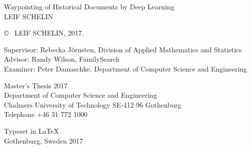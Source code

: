 \newpage
\thispagestyle{plain}
\vspace*{4.5cm}
Waypointing of Historical Documents by Deep Learning\\
LEIF SCHELIN \setlength{\parskip}{1cm}

\copyright ~ LEIF SCHELIN, 2017. \setlength{\parskip}{1cm}

Supervisor: Rebecka Jörnsten, Division of Applied Mathematics and Statistics\\
Advisor: Randy Wilson, FamilySearch\\
Examiner: Peter Damaschke, Department of Computer Science and Engineering \setlength{\parskip}{1cm}

Master's Thesis 2017\\	%
Department of Computer Science and Engineering\\
Chalmers University of Technology
SE-412 96 Gothenburg\\
Telephone +46 31 772 1000 \setlength{\parskip}{0.5cm}

\vfill


Typeset in \LaTeX \\
Gothenburg, Sweden 2017


